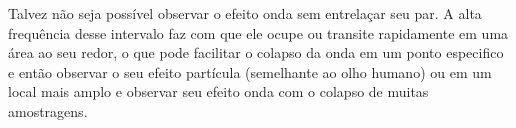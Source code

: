 Talvez não seja possível observar o efeito onda sem entrelaçar seu par. A alta frequência desse intervalo faz com que ele ocupe ou transite rapidamente em uma área ao seu redor, o que pode facilitar o colapso da onda em um ponto especifico e então observar o seu efeito partícula (semelhante ao olho humano) ou em um local mais amplo e observar seu efeito onda com o colapso de muitas amostragens.
